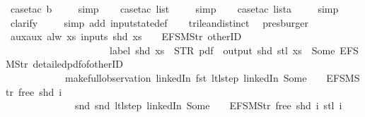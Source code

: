 \begin{isabellebody}
\ {\isacharparenleft}case{\isacharunderscore}tac\ b{\isacharparenright}\isanewline
\ \ \ \isamarkupfalse%
\ simp\isanewline
\ \ \isamarkupfalse%
\ {\isacharparenleft}case{\isacharunderscore}tac\ list{\isacharparenright}\isanewline
\ \ \ \isamarkupfalse%
\ simp\isanewline
\ \ \isamarkupfalse%
\ {\isacharparenleft}case{\isacharunderscore}tac\ lista{\isacharparenright}\isanewline
\ \ \ \isamarkupfalse%
\ simp\isanewline
\ \ \isamarkupfalse%
\ clarify\isanewline
\ \ \ \isamarkupfalse%
\ {\isacharparenleft}simp\ add{\isacharcolon}\ input{}state{\isacharunderscore}def{\isacharparenright}\isanewline
\ \ \isamarkupfalse%
\ trilean{\isachardot}distinct{\isacharparenleft}{}{\isacharparenright}\ \isamarkupfalse%
\ presburger%
\endisatagproof
{\isafoldproof}%
%
\isadelimproof
\isanewline
%
\endisadelimproof
\isanewline
{}\isamarkupfalse%
\ aux{}{\isacharunderscore}aux{}{\isacharcolon}\ {\isachardoublequoteopen}alw\ {\isacharparenleft}{\isasymlambda}xs{\isachardot}\ inputs\ {\isacharparenleft}shd\ xs{\isacharparenright}\ {\isacharbang}\ {}\ {\isacharequal}\ EFSM{\isachardot}Str\ {\isacharprime}{\isacharprime}otherID{\isacharprime}{\isacharprime}\ {\isasymlongrightarrow}\isanewline
\ \ \ \ \ \ \ \ \ \ \ \ \ \ \ \ \ \ \ \ \ label\ {\isacharparenleft}shd\ xs{\isacharparenright}\ {\isacharequal}\ STR\ {\isacharprime}{\isacharprime}pdf{\isacharprime}{\isacharprime}\ {\isasymlongrightarrow}\ output\ {\isacharparenleft}shd\ {\isacharparenleft}stl\ xs{\isacharparenright}{\isacharparenright}\ {\isasymnoteq}\ {\isacharbrackleft}Some\ {\isacharparenleft}EFSM{\isachardot}Str\ {\isacharprime}{\isacharprime}detailed{\isacharunderscore}pdf{\isacharunderscore}of{\isacharunderscore}otherID{\isacharprime}{\isacharprime}{\isacharparenright}{\isacharbrackright}{\isacharparenright}\isanewline
\ \ \ \ \ \ \ \ \ \ \ \ {\isacharparenleft}make{\isacharunderscore}full{\isacharunderscore}observation\ linkedIn\ {\isacharparenleft}fst\ {\isacharparenleft}ltl{\isacharunderscore}step\ linkedIn\ {\isacharparenleft}Some\ {}{\isacharparenright}\ {\isacharless}{}\ {\isacharcolon}{\isacharequal}\ EFSM{\isachardot}Str\ {\isacharprime}{\isacharprime}free{\isacharprime}{\isacharprime}{\isachargreater}\ {\isacharparenleft}shd\ i{\isacharparenright}{\isacharparenright}{\isacharparenright}\isanewline
\ \ \ \ \ \ \ \ \ \ \ \ \ \ {\isacharparenleft}snd\ {\isacharparenleft}snd\ {\isacharparenleft}ltl{\isacharunderscore}step\ linkedIn\ {\isacharparenleft}Some\ {}{\isacharparenright}\ {\isacharless}{}\ {\isacharcolon}{\isacharequal}\ EFSM{\isachardot}Str\ {\isacharprime}{\isacharprime}free{\isacharprime}{\isacharprime}{\isachargreater}\ {\isacharparenleft}shd\ i{\isacharparenright}{\isacharparenright}{\isacharparenright}{\isacharparenright}\ {\isacharparenleft}stl\ i{\isacharparenright}{\isacharparenright}{\isachardoublequoteclose}\isanewline

\end{isabellebody}
